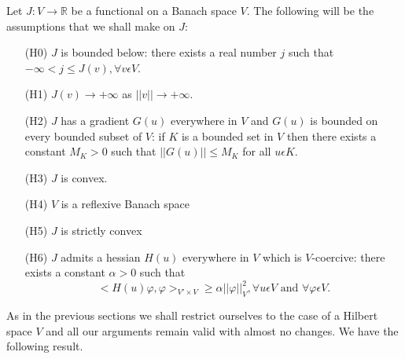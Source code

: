 Let $J : V \to \mathbb{R}$ be a functional on a Banach space $V$. The following will be the assumptions that we shall make on $J$:

\begin{enumerate}
\item[(H0)] $J$ is bounded below: there exists a real number $j$ such that $-\infty < j \leq J(v), \forall v \epsilon V$.

\item[(H1)] $J(v) \to + \infty$ as $||v|| \to + \infty$.

\item[(H2)] $J$ has a gradient $G(u)$ everywhere in $V$ and $G(u)$ is bounded on  every bounded subset of $V$: if $K$ is a bounded set in $V$ then there exists a constant $M_{K} > 0$ such that $||G(u)|| \leq M_{K}$ for all $u \epsilon K$.

\item[(H3)] $J$ is convex.

\item[(H4)] $V$ is a reflexive Banach space

\item[(H5)] $J$ is strictly convex

\item[(H6)] $J$ admits a hessian $H(u)$ everywhere in $V$ which is $V$-coercive: there exists a constant $\alpha > 0$ such that
$$
<H(u) \varphi, \varphi>_{V' \times V} \geq \alpha||\varphi||_{V}^{2}, \forall u \epsilon V \text{ and } \forall \varphi \epsilon V.
$$
\end{enumerate}

As in the previous sections we shall restrict ourselves to the case of a Hilbert space $V$ and all our arguments remain valid with almost no changes. We have the following result.

